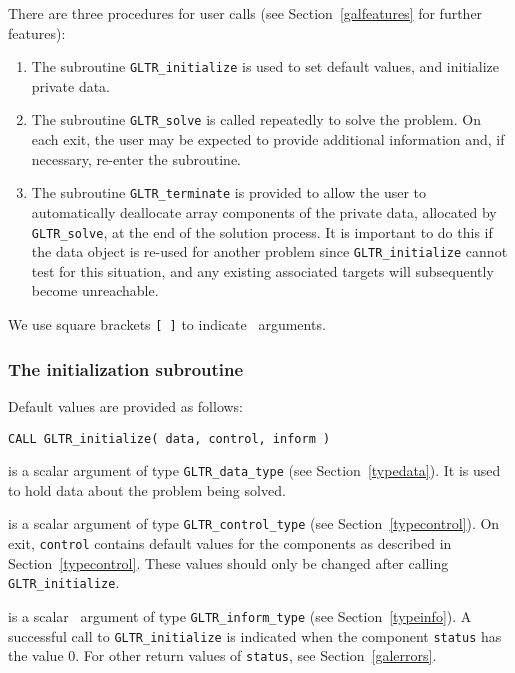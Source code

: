 \documentclass{galahad}
\newcommand{\packagename}{GL\-TR}
\begin{document}

\galarguments
There are three procedures for user calls
(see Section~\ref{galfeatures} for further features):

\begin{enumerate}
\item The subroutine
      {\tt \packagename\_initialize}
      is used to set default values, and initialize private data.
\item The subroutine
      {\tt \packagename\_solve}
      is called repeatedly to solve the problem.
      On each exit, the user may be expected to provide additional
      information and, if necessary, re-enter the subroutine.
\item The subroutine
      {\tt \packagename\_terminate}
      is provided to allow the user to automatically deallocate array
       components of the private data, allocated by
       {\tt \packagename\_solve},
       at the end of the solution process.
       It is important to do this if the data object is re-used for another
       problem since {\tt \packagename\_initialize} cannot test for this
       situation,
       and any existing associated targets will subsequently become
       unreachable.
\end{enumerate}
We use square brackets {\tt [ ]} to indicate \optional\ arguments.


\subsubsection{The initialization subroutine}\label{subinit}
 Default values are provided as follows:

\hskip0.5in
{\tt CALL \packagename\_initialize( data, control, inform )}

\begin{description}

 is a scalar \intentinout argument of type
{\tt \packagename\_data\_type}
(see Section~\ref{typedata}). It is used to hold data about the problem being
solved.

 is a scalar \intentout argument of type
{\tt \packagename\_control\_type}
(see Section~\ref{typecontrol}).
On exit, {\tt control} contains default values for the components as
described in Section~\ref{typecontrol}.
These values should only be changed after calling
{\tt \packagename\_initialize}.

 is a scalar \intentout\ argument of type
{\tt \packagename\_inform\_type}
(see Section~\ref{typeinfo}). A successful call to
{\tt \packagename\_initialize}
is indicated when the  component {\tt status} has the value 0.
For other return values of {\tt status}, see Section~\ref{galerrors}.

\end{description}
\end{document}
